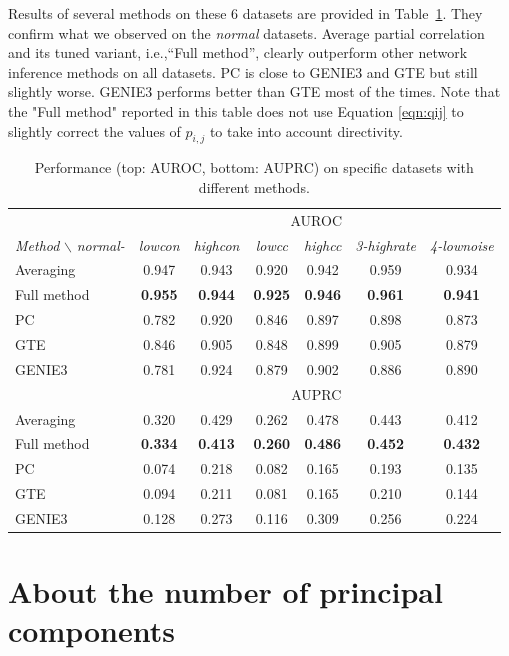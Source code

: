 \documentclass[wcp]{jmlr}
\begin{document}
Results of several methods on these 6 datasets are provided in
Table~\ref{tab:results_appendix}. They confirm what we observed on the
\textit{normal} datasets. Average partial correlation and its tuned variant,
i.e.,``Full method'', clearly outperform other network inference methods on all
datasets. PC is close to GENIE3 and GTE but still slightly worse. GENIE3
performs better than GTE most of the times. Note that the "Full method" reported in this table does not use Equation \ref{eqn:qij} to slightly correct the values of $p_{i,j}$  to take into account directivity.

\begin{table}[h]
\caption{Performance (top: AUROC, bottom: AUPRC) on specific datasets with different methods.}
\label{tab:results_appendix}
\centering
\small
\begin{tabular}{| l | c c c c c c |}
\hline
& \multicolumn{6}{c|}{AUROC}\\
\textit{Method} $\backslash$ \textit{normal-} & \textit{lowcon} & \textit{highcon} & \textit{lowcc} & \textit{highcc} & \textit{3-highrate} & \textit{4-lownoise} \\
\hline
Averaging     & 0.947 & 0.943 & 0.920 & 0.942 & 0.959 & 0.934 \\
Full method   & \textbf{0.955} & \textbf{0.944} &  \textbf{0.925} & \textbf{0.946} & \textbf{0.961} & \textbf{0.941} \\
PC & 0.782 & 0.920 &  0.846 & 0.897  & 0.898  & 0.873 \\
GTE & 0.846 & 0.905 & 0.848 & 0.899 & 0.905 & 0.879\\
GENIE3 & 0.781 &  0.924 & 0.879 & 0.902 & 0.886 &  0.890 \\ \hline \hline
& \multicolumn{6}{c|}{AUPRC}\\ \hline
Averaging     & 0.320 & 0.429 & 0.262 & 0.478 & 0.443 & 0.412 \\
Full method   & \textbf{0.334} & \textbf{0.413} &  \textbf{0.260} & \textbf{0.486} & \textbf{0.452} & \textbf{0.432}\\
PC & 0.074 & 0.218 & 0.082 & 0.165  & 0.193 & 0.135 \\
GTE & 0.094 & 0.211 & 0.081 & 0.165 & 0.210 & 0.144\\
GENIE3 & 0.128 & 0.273 & 0.116 & 0.309 & 0.256 & 0.224\\ \hline
\end{tabular}
\end{table}

\section{About the number of principal components}
\label{app:pca}
\end{document}
